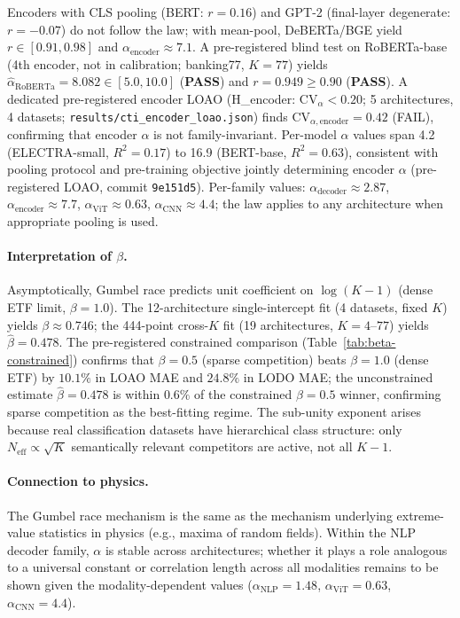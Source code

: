 \documentclass{article}
\begin{document}
Encoders with CLS pooling (BERT: $r=0.16$) and GPT-2 (final-layer degenerate: $r=-0.07$) do not follow the law; with mean-pool, DeBERTa/BGE yield $r\in[0.91,0.98]$ and $\alpha_\mathrm{encoder}\approx7.1$.
A pre-registered blind test on RoBERTa-base (4th encoder, not in calibration; banking77, $K=77$) yields $\hat\alpha_\mathrm{RoBERTa}=8.082\in[5.0,10.0]$ (\textbf{PASS}) and $r=0.949\geq0.90$ (\textbf{PASS}).
A dedicated pre-registered encoder LOAO (H\_encoder: CV$_\alpha < 0.20$; 5 architectures, 4 datasets; \texttt{results/cti\_encoder\_loao.json}) finds $\mathrm{CV}_{\alpha,\mathrm{encoder}}=0.42$ (FAIL), confirming that encoder $\alpha$ is not family-invariant. Per-model $\alpha$ values span 4.2 (ELECTRA-small, $R^2=0.17$) to 16.9 (BERT-base, $R^2=0.63$), consistent with pooling protocol and pre-training objective jointly determining encoder $\alpha$ (pre-registered LOAO, commit \texttt{9e151d5}).
Per-family values: $\alpha_\mathrm{decoder}\approx2.87$, $\alpha_\mathrm{encoder}\approx7.7$, $\alpha_\mathrm{ViT}\approx0.63$, $\alpha_\mathrm{CNN}\approx4.4$; the law applies to any architecture when appropriate pooling is used.

\paragraph{Interpretation of $\beta$.}
Asymptotically, Gumbel race predicts unit coefficient on $\log(K-1)$ (dense ETF limit, $\beta=1.0$).
The 12-architecture single-intercept fit (4 datasets, fixed $K$) yields $\beta\approx0.746$;
the 444-point cross-$K$ fit (19 architectures, $K=4$--$77$) yields $\hat\beta=0.478$.
The pre-registered constrained comparison (Table~\ref{tab:beta-constrained}) confirms that
$\beta=0.5$ (sparse competition) beats $\beta=1.0$ (dense ETF) by $10.1\%$ in LOAO MAE and $24.8\%$
in LODO MAE; the unconstrained estimate $\hat\beta=0.478$ is within $0.6\%$ of the constrained
$\beta=0.5$ winner, confirming sparse competition as the best-fitting regime.
The sub-unity exponent arises because real classification datasets have hierarchical class
structure: only $N_\mathrm{eff}\propto\sqrt{K}$ semantically relevant competitors are active,
not all $K-1$.

\paragraph{Connection to physics.}
The Gumbel race mechanism is the same as the mechanism underlying extreme-value statistics in physics (e.g., maxima of random fields). Within the NLP decoder family, $\alpha$ is stable across architectures; whether it plays a role analogous to a universal constant or correlation length across all modalities remains to be shown given the modality-dependent values ($\alpha_\mathrm{NLP}=1.48$, $\alpha_\mathrm{ViT}=0.63$, $\alpha_\mathrm{CNN}=4.4$).
\end{document}
